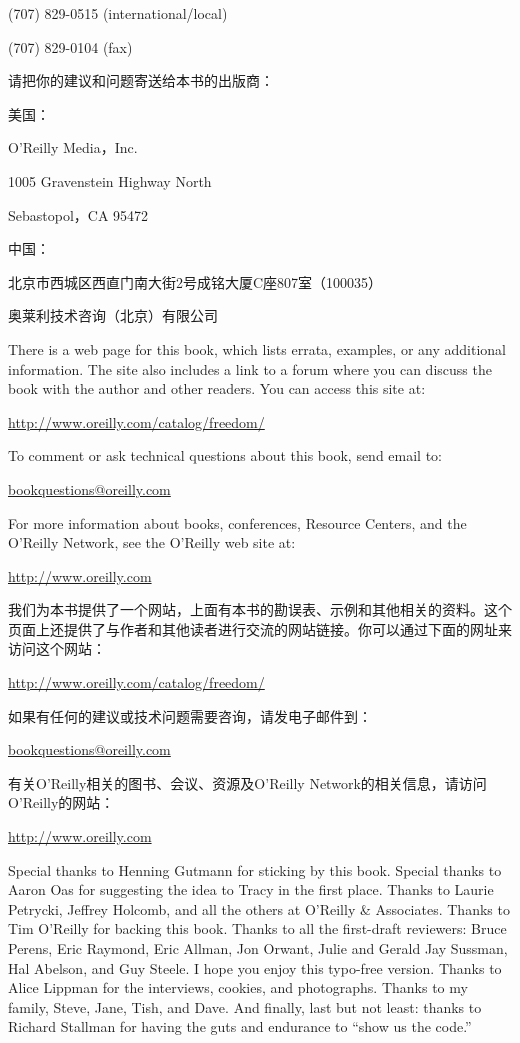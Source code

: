 (707) 829-0515 (international/local) 

(707) 829-0104 (fax)
\fi

\ifdefined\chs
请把你的建议和问题寄送给本书的出版商：

美国：

O’Reilly Media，Inc.

1005 Gravenstein Highway North

Sebastopol，CA 95472

中国：

北京市西城区西直门南大街2号成铭大厦C座807室（100035）

奥莱利技术咨询（北京）有限公司 
\fi

\ifdefined\eng
There is a web page for this book, which lists errata, examples, or any additional information. The site also includes a link to a forum where you can discuss the book with the author and other readers. You can access this site at:

\url{http://www.oreilly.com/catalog/freedom/}

To comment or ask technical questions about this book, send email to:

\url{bookquestions@oreilly.com}

For more information about books, conferences, Resource Centers, and the O'Reilly Network, see the O'Reilly web site at:

\url{http://www.oreilly.com}
\fi

\ifdefined\chs
我们为本书提供了一个网站，上面有本书的勘误表、示例和其他相关的资料。这个页面上还提供了与作者和其他读者进行交流的网站链接。你可以通过下面的网址来访问这个网站：

\url{http://www.oreilly.com/catalog/freedom/}

如果有任何的建议或技术问题需要咨询，请发电子邮件到：

\url{bookquestions@oreilly.com}

有关O’Reilly相关的图书、会议、资源及O’Reilly Network的相关信息，请访问O’Reilly的网站：

\url{http://www.oreilly.com}
\fi

\bigskip 

\ifdefined\eng
{}
\fi

\ifdefined\chs
{}
\fi

\bigskip 

\ifdefined\eng
Special thanks to Henning Gutmann for sticking by this book. Special thanks to Aaron Oas for suggesting the idea to Tracy in the first place. Thanks to Laurie Petrycki, Jeffrey Holcomb, and all the others at O'Reilly \& Associates. Thanks to Tim O'Reilly for backing this book. Thanks to all the first-draft reviewers: Bruce Perens, Eric Raymond, Eric Allman, Jon Orwant, Julie and Gerald Jay Sussman, Hal Abelson, and Guy Steele. I hope you enjoy this typo-free version. Thanks to Alice Lippman for the interviews, cookies, and photographs. Thanks to my family, Steve, Jane, Tish, and Dave. And finally, last but not least: thanks to Richard Stallman for having the guts and endurance to ``show us the code.''
\fi

